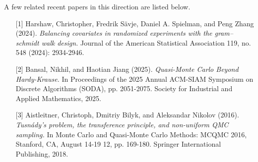 \begin{talk}
\medskip




A few related recent papers in this direction are listed below. 

\begin{enumerate}
\item [{[1]}] Harshaw, Christopher, Fredrik Sävje, Daniel A. Spielman, and Peng Zhang (2024). {\it Balancing covariates in randomized experiments with the gram–schmidt walk design.} Journal of the American Statistical Association 119, no. 548 (2024): 2934-2946.
\item[{[2]}] Bansal, Nikhil, and Haotian Jiang (2025). {\it Quasi-Monte Carlo Beyond Hardy-Krause.} In Proceedings of the 2025 Annual ACM-SIAM Symposium on Discrete Algorithms (SODA), pp. 2051-2075. Society for Industrial and Applied Mathematics, 2025. 
\item [{[3]}] Aistleitner, Christoph, Dmitriy Bilyk, and Aleksandar Nikolov (2016). {\it Tusnády’s problem, the transference principle, and non-uniform QMC sampling.} In Monte Carlo and Quasi-Monte Carlo Methods: MCQMC 2016, Stanford, CA, August 14-19 12, pp. 169-180. Springer International Publishing, 2018.
\end{enumerate}

  
\end{talk}


